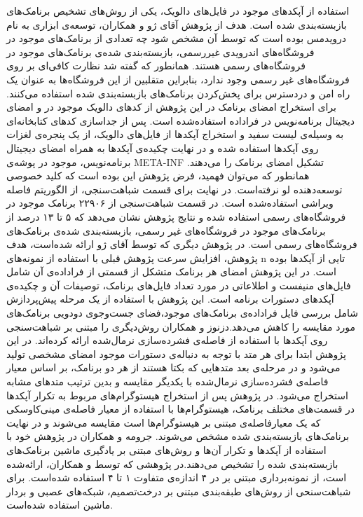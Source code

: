 استفاده از آپکد‌های موجود در فایل‌های دالویک، یکی از روش‌های تشخیص برنامک‌های بازبسته‌بندی شده است. هدف از پژوهش آقای ژو  و همکاران، توسعه‌ی ابزاری به نام درویدمس بوده است که توسط آن مشخص شود چه تعدادی از برنامک‌های موجود در فروشگاه‌های اندرویدی غیررسمی، بازبسته‌بندی شده‌ی برنامک‌های موجود در فروشگاه‌های رسمی هستند. همانطور که گفته شد نظارت کافی‌ای بر روی فروشگاه‌های غیر رسمی وجود ندارد، بنابراین متقلبین از این فروشگاه‌ها به عنوان یک راه امن و دردسترس برای پخش‌کردن برنامک‌های بازبسته‌بندی شده استفاده می‌کنند. برای استخراج امضا‌ی برنامک در این پژوهش از کد‌های دالویک موجود در  و امضای دیجیتال برنامه‌نویس در فراداده‌ استفاده‌شده است. پس از جداسازی کد‌های کتابخانه‌ای به وسیله‌ی لیست سفید و استخراج آپکد‌ها از فایل‌های دالویک، از یک پنجره‌ی لغزات روی آپکد‌ها استفاده شده و در نهایت چکیده‌ی آپکد‌ها به همراه امضای دیجیتال برنامه‌نویس، موجود در پوشه‌ی META-INF تشکیل امضا‌ی برنامک را می‌دهند. همانطور که می‌توان فهمید، فرض پژوهش این بوده است که کلید خصوصی توسعه‌دهنده لو نرفته‌است. در نهایت برای قسمت‌ شباهت‌سنجی، از الگوریتم فاصله ویراشی استفاده‌شده است. در قسمت شباهت‌سنجی از ۲۲۹۰۶ برنامک موجود در فروشگاه‌های رسمی استفاده شده‌ و نتایج پژوهش نشان می‌دهد که ۵ تا ۱۳ درصد از برنامک‌های موجود در فروشگاه‌های غیر رسمی، بازبسته‌بندی شده‌ی برنامک‌های فروشگاه‌های رسمی است. در پژوهش دیگری که توسط آقای ژو ارائه شده‌است، هدف پژوهش، افزایش سرعت پژوهش‌ قبلی با استفاده از نمونه‌های n تایی از آپکد‌ها بوده است. در این پژوهش امضای هر برنامک متشکل از قسمتی از فراداده‌ی آن شامل فایل‌های منیفست و اطلاعاتی در مورد تعداد فایل‌های برنامک، توصیفات آن و چکیده‌ی آپکد‌های دستورات برنامه‌ است. این پژوهش با استفاده از یک مرحله پیش‌پردازش شامل بررسی فایل فراداده‌ی برنامک‌های موجود،‌فضای جست‌و‌جوی دودویی برنامک‌های مورد مقایسه را کاهش می‌دهد.دزنوز و همکاران روش‌دیگری را مبتنی بر شباهت‌سنجی روی آپکد‌ها با استفاده از فاصله‌ی فشرده‌سازی نرما‌ل‌شده ارائه کرده‌اند. در این پژوهش ابتدا برای هر متد با توجه به دنباله‌ی دستورات موجود امضای مشخصی تولید می‌شود و در مرحله‌ی بعد متد‌هایی که بکتا هستند از هر دو برنامک، بر اساس معیار فاصله‌ی فشرده‌سازی نرمال‌شده با یکدیگر مقایسه و بدین ترتیب متد‌های مشابه‌ استخراج می‌شود. در پژوهش  پس از استخراج هیستوگرام‌های مربوط به تکرار آپکد‌ها در قسمت‌های مختلف برنامک، هیستوگرام‌ها با استفاده از معیار فاصله‌ی  مینی‌کاوسکی که یک معیارفاصله‌ی مبتنی بر هیستوگرام‌ها است مقایسه‌ می‌شوند و در نهایت برنامک‌های بازبسته‌بندی شده مشخص می‌شوند. جرومه و همکاران در پژوهش خود با استفاده از آپکد‌ها و تکرار آن‌ها و روش‌های مبتنی بر یادگیری ماشین برنامک‌های بازبسته‌بندی شده را تشخیص می‌دهند.در پژوهشی که توسط  و همکاران، ارائه‌شده است، از نمونه‌برداری مبتنی بر  در ۴ اندازه‌ی متفاوت ۱ تا ۴ استفاده شده‌است. برای شباهت‌سنحی از روش‌های طبقه‌بندی مبتنی بر درخت‌تصمیم، شبکه‌های عصبی و بردار ماشین استفاده شده‌است.\\

